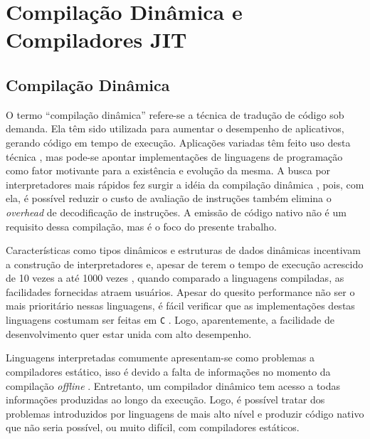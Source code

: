 \chapter{Compilação Dinâmica e Compiladores JIT}
\label{compdyn}

\section{Compilação Dinâmica}

O termo ``compilação dinâmica'' refere-se a técnica de tradução de
código sob demanda. Ela têm sido utilizada para aumentar o desempenho
de aplicativos, gerando código em tempo de execução. Aplicações
variadas têm feito uso desta técnica \cite{holzle}, mas pode-se apontar
implementações de linguagens de programação como fator motivante para
a existência e evolução da mesma. A busca por
interpretadores mais rápidos fez surgir a idéia da compilação dinâmica
\cite{holzle}, pois, com ela, é possível reduzir o custo de avaliação de
instruções também elimina o \textit{overhead} de decodificação de instruções.
A emissão de código nativo não é um requisito dessa compilação, mas é
o foco do presente trabalho.

Características como tipos dinâmicos e estruturas de dados dinâmicas
incentivam a construção de interpretadores
\cite{trustworthycompilers} e, apesar de terem o tempo de execução
acrescido de 10 vezes \cite{plezbert} a até 1000 vezes
\cite{trustworthycompilers}, quando comparado a linguagens compiladas, as
facilidades fornecidas atraem usuários. Apesar do quesito performance
não ser o mais prioritário nessas linguagens, é fácil verificar que as
implementações destas linguagens costumam ser feitas em \texttt{C}
\cite{dyla1}. Logo,
aparentemente, a facilidade de desenvolvimento quer estar unida com
alto desempenho.

Linguagens interpretadas comumente apresentam-se como problemas a
compiladores estático, isso é devido a falta de informações no momento
da compilação \textit{offline} \cite{holzle}.
Entretanto, um compilador dinâmico tem acesso a todas informações
produzidas ao longo da execução.
Logo, é possível tratar dos problemas
introduzidos por linguagens de mais alto nível e produzir código
nativo que não seria possível, ou muito difícil, com compiladores
estáticos.

